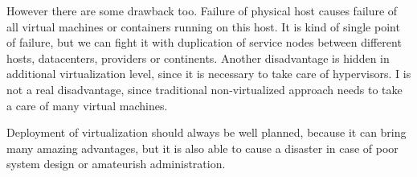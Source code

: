 However there are some drawback too. Failure of physical host causes failure of all virtual machines or containers running on this host. It is kind of single point of failure, but we can fight it with duplication of service nodes between different hosts, datacenters, providers or continents.
Another disadvantage is hidden in additional virtualization level, since it is necessary to take care of hypervisors. I is not a real disadvantage, since traditional non-virtualized approach needs to take a care of many virtual machines.

Deployment of virtualization should always be well planned, because it can bring many amazing advantages, but it is also able to cause a disaster in case of poor system design or amateurish administration.
